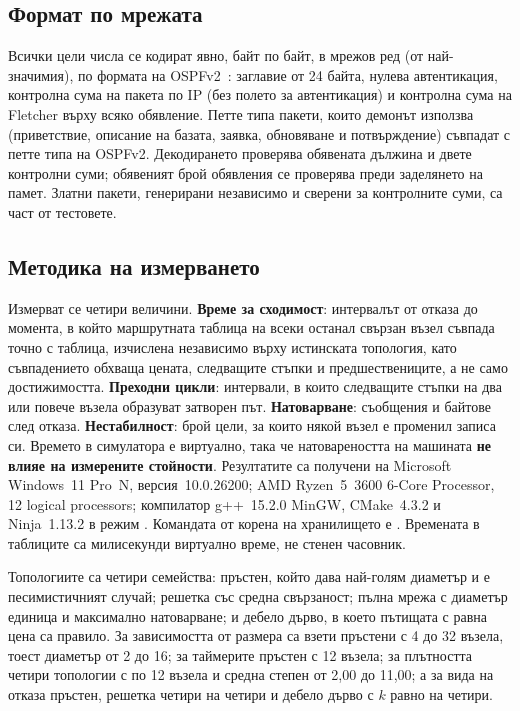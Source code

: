 \subsection{Формат по мрежата}

Всички цели числа се кодират явно, байт по байт, в мрежов ред (от най-значимия), по формата на
OSPFv2~\cite{rfc2328}: заглавие от 24 байта, нулева автентикация, контролна сума на пакета по
IP (без полето за автентикация) и контролна сума на Fletcher върху всяко обявление. Петте типа
пакети, които демонът използва (приветствие, описание на базата, заявка, обновяване и
потвърждение) съвпадат с петте типа на OSPFv2. Декодирането проверява обявената дължина и
двете контролни суми; обявеният брой обявления се проверява преди заделянето на памет. Златни
пакети, генерирани независимо и сверени за контролните суми, са част от тестовете.

\subsection{Методика на измерването}

Измерват се четири величини. \textbf{Време за сходимост}: интервалът от отказа до момента, в
който маршрутната таблица на всеки останал свързан възел съвпада точно с таблица, изчислена
независимо върху истинската топология, като съвпадението обхваща цената, следващите стъпки и
предшествениците, а не само достижимостта. \textbf{Преходни цикли}: интервали, в които
следващите стъпки на два или повече възела образуват затворен път. \textbf{Натоварване}:
съобщения и байтове след отказа. \textbf{Нестабилност}: брой цели, за които някой възел е
променил записа си. Времето в симулатора е виртуално, така че натовареността на машината
\textbf{не влияе на измерените стойности}. Резултатите са получени на Microsoft
Windows~11 Pro~N, версия~10.0.26200; AMD Ryzen~5~3600 6-Core Processor, 12 logical
processors; компилатор g++~15.2.0 MinGW, CMake~4.3.2 и Ninja~1.13.2 в режим
. Командата от корена на хранилището е
. Времената в
таблиците са милисекунди виртуално време, не стенен часовник.

Топологиите са четири семейства: пръстен, който дава най-голям диаметър и е песимистичният
случай; решетка със средна свързаност; пълна мрежа с диаметър единица и максимално натоварване;
и дебело дърво, в което пътищата с равна цена са правило. За зависимостта от размера са взети
пръстени с 4 до 32 възела, тоест диаметър от 2 до 16; за таймерите пръстен с 12 възела; за
плътността четири топологии с по 12 възела и средна степен от 2,00 до 11,00; а за вида на
отказа пръстен, решетка четири на четири и дебело дърво с $k$ равно на четири.

